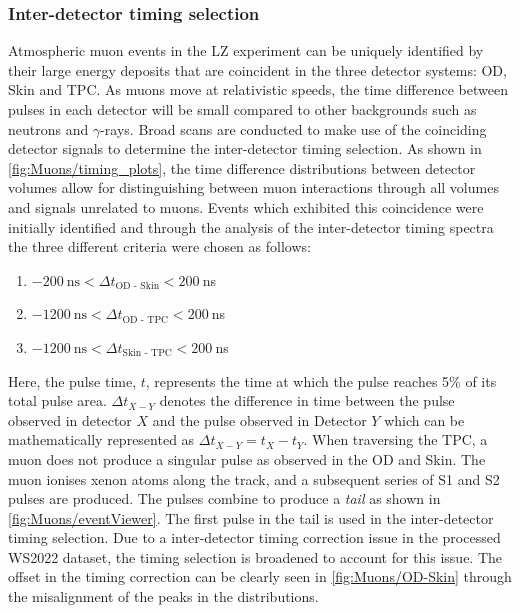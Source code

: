 \subsubsection{Inter-detector timing selection}\label{sec:Muons/MuonFluxTimingSelection}
Atmospheric muon events in the LZ experiment can be uniquely identified by their large energy deposits that are coincident in the three detector systems: OD, Skin and TPC. As muons move at relativistic speeds, the time difference between pulses in each detector will be small compared to other backgrounds such as neutrons and $\gamma$-rays.
Broad scans are conducted to make use of the coinciding detector signals to determine the inter-detector timing selection. As shown in \autoref{fig:Muons/timing_plots}, the time difference distributions between detector volumes allow for distinguishing between muon interactions through all volumes and signals unrelated to muons. Events which exhibited this coincidence were initially identified and through the analysis of the inter-detector timing spectra the three different criteria were chosen as follows:
 \begin{enumerate}
    \item $-200~\text{ns} < \Delta t_{\text{OD - Skin}} < 200~$ns
    \item $-1200~\text{ns} < \Delta t_{\text{OD - TPC}} < 200~$ns
    \item $-1200~\text{ns} < \Delta t_{\text{Skin - TPC}} < 200~$ns
\end{enumerate}
Here, the pulse time, $t$, represents the time at which the pulse reaches 5\% of its total pulse area. $\Delta t_{X-Y}$ denotes the difference in time between the pulse observed in detector $X$ and the pulse observed in Detector $Y$ which can be mathematically represented as $\Delta t_{X-Y}=t_X-t_Y$. When traversing the TPC, a muon does not produce a singular pulse as observed in the OD and Skin. The muon ionises xenon atoms along the track, and a subsequent series of S1 and S2 pulses are produced. The pulses combine to produce a \textit{tail} as shown in \autoref{fig:Muons/eventViewer}. The first pulse in the tail is used in the inter-detector timing selection. Due to a inter-detector timing correction issue in the processed WS2022 dataset, the timing selection is broadened to account for this issue. The offset in the timing correction can be clearly seen in \autoref{fig:Muons/OD-Skin} through the misalignment of the peaks in the distributions.
